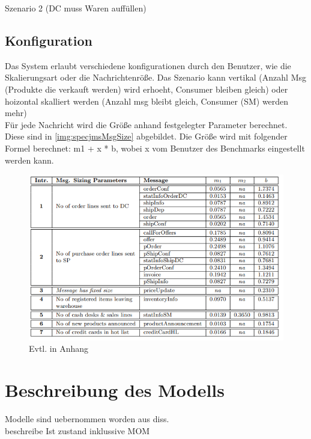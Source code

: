 Szenario 2 (DC muss Waren auffüllen)

\subsection{Konfiguration}
Das System erlaubt verschiedene konfigurationen durch den Benutzer, wie die Skalierungsart oder die Nachrichtenröße. Das Szenario kann vertikal (Anzahl Msg (Produkte die verkauft werden) wird erhoeht, Consumer bleiben gleich) oder
hoizontal skalliert werden (Anzahl msg bleibt gleich, Consumer (SM) werden mehr)\\

Für jede Nachricht wird die Größe anhand festgelegter Parameter berechnet. Diese sind in \autoref{img:specjmsMsgSize} abgebildet. Die Größe wird mit folgender Formel berechnet: m1 + x * b, wobei x vom Benutzer des Benchmarks eingestellt werden kann.

\begin{figure}
\center
  \includegraphics[width=1\textwidth]{images/specjmsmsgsize.png}
  \caption{Evtl. in Anhang}
  \label{img:specjmsMsgSize}
\end{figure}

\section{Beschreibung des Modells}
Modelle sind uebernommen worden aus diss. \\
beschreibe Ist zustand inklussive MOM
